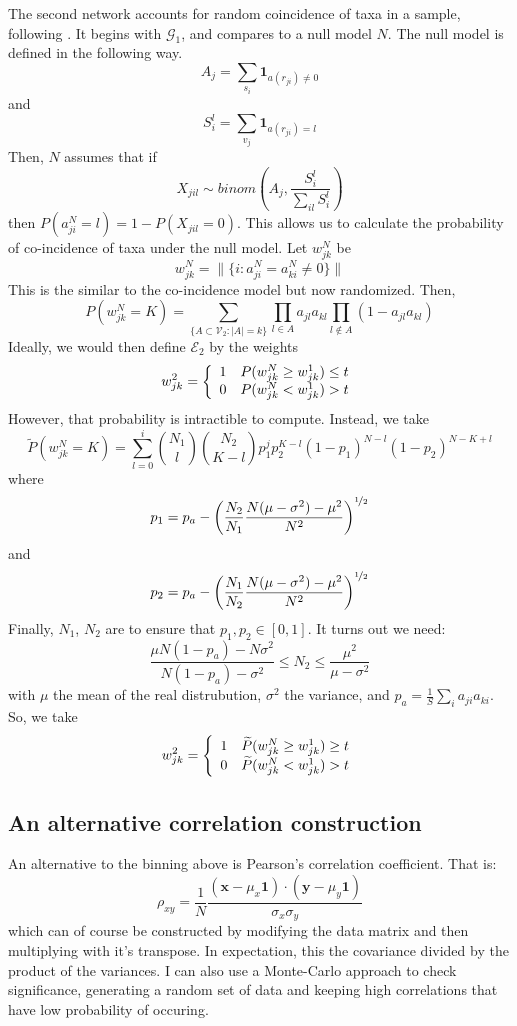 \documentclass[10pt]{article}
\theoremstyle{definition}
\numberwithin{theorem}{section}
\numberwithin{definition}{section}
\numberwithin{lemma}{section}
\numberwithin{corollary}{section}
\numberwithin{clm}{section}
\numberwithin{rmk}{section}
\newcommand{\nhalf}{\nicefrac{1}{2}}
\renewcommand{\b}{\bm}
\newcommand{\cE}{\mathcal{E}}
\newcommand{\cG}{\mathcal{G}}
\newcommand{\cV}{\mathcal{V}}
\begin{document}
The second network accounts for random coincidence of taxa in a sample, following \cite{coocc}. It begins with $\cG_1$, and compares to a null model $N$. The null model is defined in the following way.
\[
A_j= \sum_{s_i} \b{1}_{a(r_{ji}) \neq 0}
\] 
and 
\[
S_i^l  = \sum_{v_j} \b{1}_{a(r_{ji}) = l}
\]
Then, $N$ assumes that if
\[
X_{jil} \sim \mathit{binom}\left(A_j, \frac{S_i^l}{\sum_{il} S_i^l}\right)
\]
then $P(a_{ji}^N = l) = 1-P(X_{jil} = 0)$. This allows us to calculate the probability of co-incidence of taxa under the null model. Let $w_{jk}^N$ be
\[
w^N_{jk} = \|\{i: a_{ji}^N = a_{ki}^N \neq 0\} \|
\]
This is the similar to the co-incidence model but now randomized. Then,
\[
P(w_{jk}^N = K) =  \sum_{\{A \subset \cV_2:|A| = k\}} \prod_{l\in A} a_{jl}a_{kl}\prod_{l \not\in A} (1- a_{jl}a_{kl})
\]
Ideally, we would then define $\cE_2$ by the weights
\[
w_{jk}^2 = \left\{ \begin{array}{c c}
1 & P(w_{jk}^N \geq w_{jk}^1) \leq t\\
0 & P(w_{jk}^N < w_{jk}^1) > t
\end{array}\right.
\]
However, that probability is intractible to compute. Instead, we take 
\[
\widetilde{P}(w_{jk}^N = K) = \sum_{l=0}^i \binom{N_1}{l}\binom{N_2}{K-l} p_1^j p_2^{K-l} (1-p_1)^{N-l}(1-p_2)^{N-K+l}
\]
where
\[
p_1 = p_a - \left(\frac{N_2}{N_1}\frac{N(\mu-\sigma^2)- \mu^2}{N^2}\right)^{\nhalf}
\]
and 
\[
p_2 = p_a - \left(\frac{N_1}{N_2}\frac{N(\mu-\sigma^2)- \mu^2}{N^2}\right)^{\nhalf}
\]
Finally, $N_1$, $N_2$ are to ensure that $p_1,p_2 \in [0,1]$. It turns out we need:
\[
\frac{\mu N (1-p_a) - N\sigma^2}{N(1-p_a)- \sigma^2} \leq N_2 \leq \frac{\mu^2}{\mu- \sigma^2}
\]
with $\mu$ the mean of the real distrubution, $\sigma^2$ the variance, and $p_a = \frac{1}{S}\sum_{i} a_{ji}a_{ki}$. So, we take 
\[
w_{jk}^2 = \left\{ \begin{array}{c c}
1 & \widetilde{P}(w_{jk}^N \geq w_{jk}^1) \geq t\\
0 & \widetilde{P}(w_{jk}^N < w_{jk}^1) > t
\end{array}\right.
\]

\subsection{An alternative correlation construction}
An alternative to the binning above is Pearson's correlation coefficient. That is:
\[
\rho_{xy} = \frac{1}{N}\frac{(\b{x}- \mu_x\b{1}) \cdot (\b{y} - \mu_y\b{1})}{\sigma_x \sigma_y}
\]
which can of course be constructed by modifying the data matrix and then multiplying with it's transpose. In expectation, this the covariance divided by the product of the variances. I can also use a Monte-Carlo approach to check significance, generating a random set of data and keeping high correlations that have low probability of occuring. 
\end{document}
